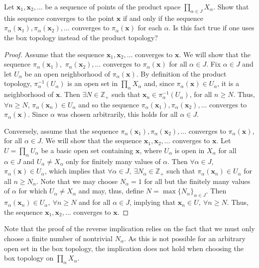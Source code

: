 \documentclass[a4paper,10pt]{article}
\newcommand{\bx}{\mathbf{x}}
\newcommand{\inv}{^{-1}}
\newcommand{\ZZ}{\mathbb{Z}}
\begin{document}
\begin{exercise}[ID=2.19.6]
    Let $\bx_1, \bx_2, \ldots$ be a sequence of points of the product space $\prod_{\alpha \in J} X_\alpha$.
    Show that this sequence converges to the point $\bx$ if and only if the sequence $\pi_\alpha(\bx_1), \pi_\alpha(\bx_2), \ldots$ converges to $\pi_\alpha(\bx)$ for each $\alpha$.
    Is this fact true if one uses the box topology instead of the product topology?
\end{exercise}

\begin{solution}
    \begin{proof}
        Assume that the sequence $\bx_1, \bx_2, \ldots$ converges to $\bx$.
        We will show that the sequence $\pi_\alpha(\bx_1),$\newline
        $\pi_\alpha(\bx_2), \ldots$ converges to $\pi_\alpha(\bx)$ for all $\alpha \in J$.
        Fix $\alpha \in J$ and let $U_\alpha$ be an open neighborhood of $\pi_\alpha(\bx)$.
        By definition of the product topology, $\pi_\alpha\inv(U_\alpha)$ is an open set in $\prod_\alpha X_\alpha$ and, since $\pi_\alpha(\bx) \in U_\alpha$, it is a neighborhood of $\bx$.
        Then $\exists N \in \ZZ_+$ such that $\bx_n \in \pi_\alpha\inv(U_\alpha)$, for all $n \geq N$.
        Thus, $\forall n \geq N$, $\pi_\alpha(\bx_n) \in U_\alpha$ and so the sequence $\pi_\alpha(\bx_1), \pi_\alpha(\bx_2), \ldots$ converges to $\pi_\alpha(\bx)$.
        Since $\alpha$ was chosen arbitrarily, this holds for all $\alpha \in J$.

        Conversely, assume that the sequence $\pi_\alpha(\bx_1), \pi_\alpha(\bx_2), \ldots$ converges to $\pi_\alpha(\bx)$, for all $\alpha \in J$.
        We will show that the sequence $\bx_1, \bx_2, \ldots$ converges to $\bx$.
        Let $U = \prod_\alpha U_\alpha$ be a basic open set containing $\bx$, where $U_\alpha$ is open in $X_\alpha$ for all $\alpha \in J$ and $U_\alpha \neq X_\alpha$ only for finitely many values of $\alpha$.
        Then $\forall \alpha \in J$, $\pi_\alpha(\bx) \in U_\alpha$, which implies that $\forall \alpha \in J,~ \exists N_\alpha \in \ZZ_+$ such that $\pi_\alpha(\bx_n) \in U_\alpha$ for all $n \geq N_\alpha$.
        Note that we may choose $N_\alpha = 1$ for all but the finitely many values of $\alpha$ for which $U_\alpha \neq X_\alpha$ and may, thus, define $N = \max\{N_\alpha\}_{\alpha \in J}$.
        Then $\pi_\alpha(\bx_n) \in U_\alpha,~ \forall n \geq N$ and for all $\alpha \in J$, implying that $\bx_n \in U,~ \forall n \geq N$.
        Thus, the sequence $\bx_1, \bx_2, \ldots$ converges to $\bx$.
    \end{proof}

    Note that the proof of the reverse implication relies on the fact that we must only choose a finite number of nontrivial $N_\alpha$.
    As this is not possible for an arbitrary open set in the box topology, the implication does not hold when choosing the box topology on $\prod_\alpha X_\alpha$.
\end{solution}
\newpage
\end{document}
